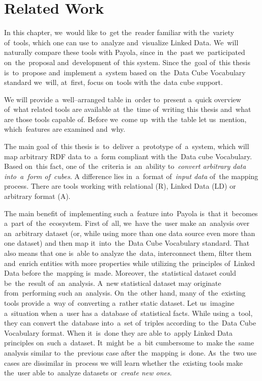 \chapter{Related Work}
\label{chap:rw}

In this chapter, we~would like to~get the~reader familiar with the~variety of~tools, which one can
use to~analyze and~visualize Linked Data. We~will naturally compare these tools with
Payola, since in~the~past we~participated on~the~proposal and~development of~this system.
Since the~goal of~this thesis is~to~propose and~implement a~system based on~the~Data Cube Vocabulary
standard we~will, at~first, focus on~tools with the~data cube support. 

We will provide a~well--arranged table in~order to~present a~quick overview of~what related tools are available at~the~time of~writing this thesis and~what are those 
tools capable of. Before we~come up~with the~table let us~mention, which~features are examined and~why.

The main goal of~this thesis is~to~deliver a~prototype of~a~system, which will map 
arbitrary RDF data to~a~form compliant with the~Data cube Vocabulary. Based on~this fact, one of~the~criteria is~an~ability to~\emph{convert arbitrary data 
into~a~form of~cubes}. A difference lies in~a~format of~\emph{input data} of~the
mapping process. There are tools working with relational (R), Linked Data (LD) or
arbitrary format (A).

The main benefit of~implementing such a~feature into~Payola is~that it~becomes a~part of~the~ecosystem. First of~all, we~have the~user make an~analysis over an~arbitrary
dataset (or, while using more than one data source even more than one dataset)
and then map it~into~the~Data Cube Vocabulary standard. That also means that one is~able
to analyze the~data, interconnect them, filter them and~enrich entities with more properties
while utilizing the~principles of~Linked Data before the~mapping is~made. Moreover, the~statistical
dataset could be~the~result of~an~analysis. A~new statistical dataset may originate from~performing
such an~analysis. On~the~other hand, many of~the~existing 
tools provide a~way of~converting a~rather static dataset. Let us~imagine a~situation when a~user has a~database of~statistical facts. While using a~tool, they can 
convert the~database into~a~set of~triples according to~the~Data Cube 
Vocabulary format. When it~is~done they are able to~apply Linked Data principles
on~such a~dataset. It~might be~a~bit cumbersome to~make the~same analysis similar to~the~previous
case after the~mapping is~done. As~the~two use cases are dissimilar in~process 
we will learn whether the~existing tools make the~user able to~analyze datasets or~\emph{create new ones}.

